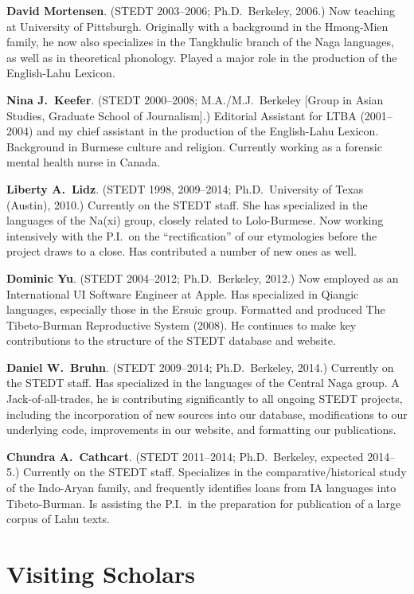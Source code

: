 \textbf{David Mortensen}. (STEDT 2003–2006; Ph.D.\ Berkeley, 2006.) Now teaching at University of Pittsburgh. Originally with a background in the Hmong-Mien family, he now also specializes in the Tangkhulic branch of the Naga languages, as well as in theoretical phonology. Played a major role in the production of the English-Lahu Lexicon.

\textbf{Nina J.\ Keefer}. (STEDT 2000–2008; M.A./M.J.\ Berkeley [Group in Asian Studies, Graduate School of Journalism].) Editorial Assistant for LTBA (2001–2004) and my chief assistant in the production of the English-Lahu Lexicon. Background in Burmese culture and religion. Currently working as a forensic mental health nurse in Canada.

\textbf{Liberty A.\ Lidz}. (STEDT 1998, 2009–2014; Ph.D.\ University of Texas (Austin), 2010.) Currently on the STEDT staff. She has specialized in the languages of the Na(xi) group, closely related to Lolo-Burmese. Now working intensively with the P.I.\ on the “rectification” of our etymologies before the project draws to a close. Has contributed a number of new ones as well.

\textbf{Dominic Yu}. (STEDT 2004–2012; Ph.D.\ Berkeley, 2012.) Now employed as an International UI Software Engineer at Apple. Has specialized in Qiangic languages, especially those in the Ersuic group. Formatted and produced The Tibeto-Burman Reproductive System (2008). He continues to make key contributions to the structure of the STEDT database and website.

\textbf{Daniel W.\ Bruhn}. (STEDT 2009–2014; Ph.D.\ Berkeley, 2014.) Currently on the STEDT staff. Has specialized in the languages of the Central Naga group. A Jack-of-all-trades, he is contributing significantly to all ongoing STEDT projects, including the incorporation of new sources into our database, modifications to our underlying code, improvements in our website, and formatting our publications.

\textbf{Chundra A.\ Cathcart}. (STEDT 2011–2014; Ph.D.\ Berkeley, expected 2014–5.) Currently on the STEDT staff. Specializes in the comparative/historical study of the Indo-Aryan family, and frequently identifies loans from IA languages into Tibeto-Burman. Is assisting the P.I.\ in the preparation for publication of a large corpus of Lahu texts.

\section{Visiting Scholars}

